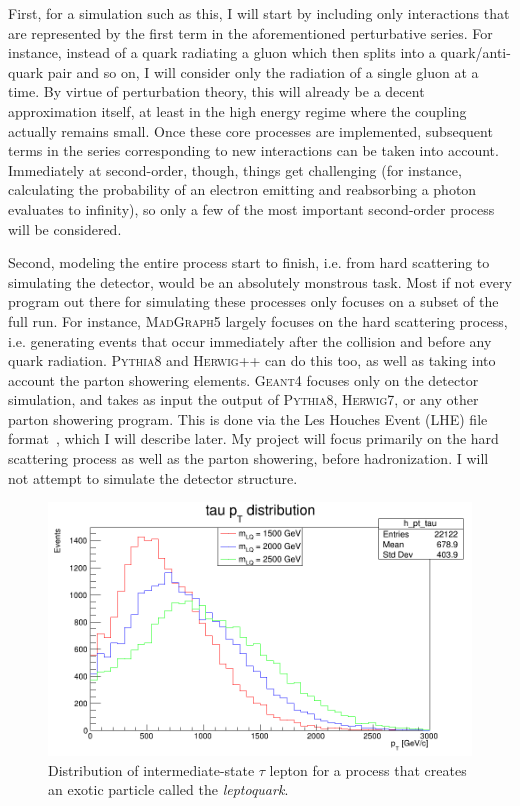 First, for a simulation such as this, I will start by including only interactions that are represented by the first term in the aforementioned perturbative series. For instance, instead of a quark radiating a gluon which then splits into a quark/anti-quark pair and so on, I will consider only the radiation of a single gluon at a time. By virtue of perturbation theory, this will already be a decent approximation itself, at least in the high energy regime where the coupling actually remains small. Once these core processes are implemented, subsequent terms in the series corresponding to new interactions can be taken into account. Immediately at second-order, though, things get challenging (for instance, calculating the probability of an electron emitting and reabsorbing a photon evaluates to infinity), so only a few of the most important second-order process will be considered.

Second, modeling the entire process start to finish, i.e. from hard scattering to simulating the detector, would be an absolutely monstrous task. Most if not every program out there for simulating these processes only focuses on a subset of the full run. For instance, \textsc{MadGraph5} largely focuses on the hard scattering process, i.e. generating events that occur immediately after the collision and before any quark radiation. \textsc{Pythia8} and \textsc{Herwig++} can do this too, as well as taking into account the parton showering elements. \textsc{Geant4} focuses only on the detector simulation, and takes as input the output of \textsc{Pythia8}, \textsc{Herwig7}, or any other parton showering program. This is done via the Les Houches Event (LHE) file format~\cite{LHEFFORMAT}, which I will describe later. My project will focus primarily on the hard scattering process as well as the parton showering, before hadronization. I will not attempt to simulate the detector structure.

\begin{figure}[ht]
  \centering
  \includegraphics[width=0.8\linewidth]{./res/Images/h_pt_tau.png}
  \caption{Distribution of intermediate-state $\tau$ lepton for a process that creates an exotic particle called the \textit{leptoquark}.}
  \label{fig:h-pt-tau}
\end{figure}


